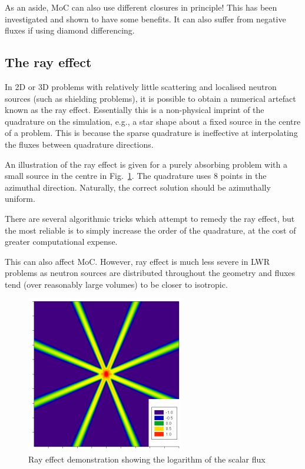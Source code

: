 \documentclass{article}
\begin{document}
As an aside, MoC can also use different closures in principle! This has been investigated and shown to have some benefits. It can also suffer from negative fluxes if using diamond differencing.

\subsection{The ray effect}

In 2D or 3D problems with relatively little scattering and localised neutron sources (such as shielding problems), it is possible to obtain a numerical artefact known as the ray effect. Essentially this is a non-physical imprint of the quadrature on the simulation, e.g., a star shape about a fixed source in the centre of a problem. This is because the sparse quadrature is ineffective at interpolating the fluxes between quadrature directions.

An illustration of the ray effect is given for a purely absorbing problem with a small source in the centre in Fig.~\ref{fig:ray_effect}. The quadrature uses 8 points in the azimuthal direction. Naturally, the correct solution should be azimuthally uniform.

There are several algorithmic tricks which attempt to remedy the ray effect, but the most reliable is to simply increase the order of the quadrature, at the cost of greater computational expense.

This can also affect MoC. However, ray effect is much less severe in LWR problems as neutron sources are distributed throughout the geometry and fluxes tend (over reasonably large volumes) to be closer to isotropic.

\begin{figure}[h!]
	\centering
	\includegraphics{./images/ray_effect.png} 
	\caption{Ray effect demonstration showing the logarithm of the scalar flux~\cite{Stone2007}} 
	\label{fig:ray_effect}
\end{figure}

\printbibliography
\end{document}
